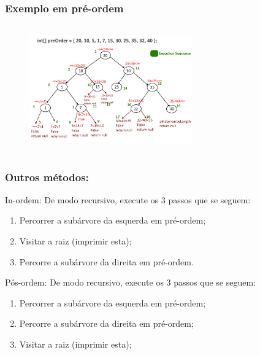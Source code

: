 \begin{frame}
  \frametitle{Exemplo em pré-ordem}
  
 \begin{figure}[!ht]
     \centering
    \includegraphics[width=7cm, height=5.5cm]{figs/fig_arvores/preorder_transversal.jpg}
    \end{figure}

\end{frame}


\begin{frame}
  
  \frametitle{Outros métodos:}
  
\begin{block}{In-ordem:}
  De modo recursivo, execute os 3 passos que se seguem:
\begin{enumerate}
 \item Percorrer a subárvore da esquerda em pré-ordem;
  \item Visitar a raiz (imprimir esta);
 \item Percorre a subárvore da direita em pré-ordem.
\end{enumerate}
 \end{block}

  
\begin{block}{Pós-ordem:}
  De modo recursivo, execute os 3 passos que se seguem:
\begin{enumerate}
 \item Percorrer a subárvore da esquerda em pré-ordem;
 \item Percorre a subárvore da direita em pré-ordem;
  \item Visitar a raiz (imprimir esta);
\end{enumerate}
 \end{block}


\end{frame}

